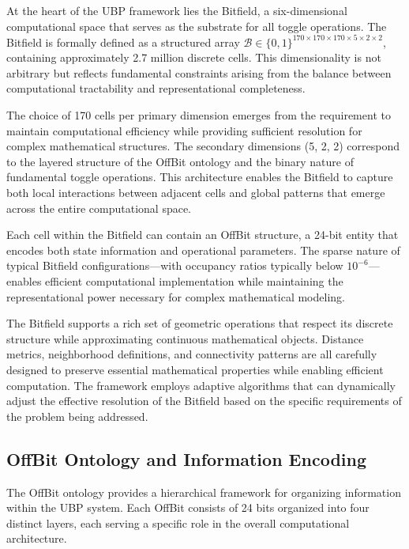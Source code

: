 \documentclass[11pt]{amsart}
\begin{document}
At the heart of the UBP framework lies the Bitfield, a six-dimensional computational space that serves as the substrate for all toggle operations. The Bitfield is formally defined as a structured array $\mathcal{B} \in \{0,1\}^{170 \times 170 \times 170 \times 5 \times 2 \times 2}$, containing approximately 2.7 million discrete cells. This dimensionality is not arbitrary but reflects fundamental constraints arising from the balance between computational tractability and representational completeness.

The choice of 170 cells per primary dimension emerges from the requirement to maintain computational efficiency while providing sufficient resolution for complex mathematical structures. The secondary dimensions (5, 2, 2) correspond to the layered structure of the OffBit ontology and the binary nature of fundamental toggle operations. This architecture enables the Bitfield to capture both local interactions between adjacent cells and global patterns that emerge across the entire computational space.

Each cell within the Bitfield can contain an OffBit structure, a 24-bit entity that encodes both state information and operational parameters. The sparse nature of typical Bitfield configurations—with occupancy ratios typically below $10^{-6}$—enables efficient computational implementation while maintaining the representational power necessary for complex mathematical modeling.

The Bitfield supports a rich set of geometric operations that respect its discrete structure while approximating continuous mathematical objects. Distance metrics, neighborhood definitions, and connectivity patterns are all carefully designed to preserve essential mathematical properties while enabling efficient computation. The framework employs adaptive algorithms that can dynamically adjust the effective resolution of the Bitfield based on the specific requirements of the problem being addressed.

\subsection{OffBit Ontology and Information Encoding}

The OffBit ontology provides a hierarchical framework for organizing information within the UBP system. Each OffBit consists of 24 bits organized into four distinct layers, each serving a specific role in the overall computational architecture.
\end{document}
